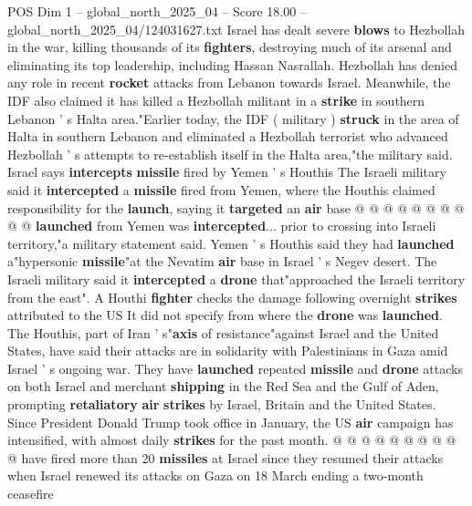 \begin{textsample}{POS Dim 1 – global\_north\_2025\_04 – Score 18.00 – global\_north\_2025\_04/124031627.txt}
Israel has dealt severe \textbf{blows} to Hezbollah in the war, killing thousands of its \textbf{fighters}, destroying much of its arsenal and eliminating its top leadership, including Hassan Nasrallah.
Hezbollah has denied any role in recent \textbf{rocket} attacks from Lebanon towards Israel.
Meanwhile, the IDF also claimed it has killed a Hezbollah militant in a \textbf{strike} in southern Lebanon ' s Halta area."Earlier today, the IDF ( military ) \textbf{struck} in the area of Halta in southern Lebanon and eliminated a Hezbollah terrorist who advanced Hezbollah ' s attempts to re-establish itself in the Halta area,"the military said.
Israel says \textbf{intercepts} \textbf{missile} fired by Yemen ' s Houthis The Israeli military said it \textbf{intercepted} a \textbf{missile} fired from Yemen, where the Houthis claimed responsibility for the \textbf{launch}, saying it \textbf{targeted} an \textbf{air} base @ @ @ @ @ @ @ @ @ @ \textbf{launched} from Yemen was \textbf{intercepted}... prior to crossing into Israeli territory,"a military statement said.
Yemen ' s Houthis said they had \textbf{launched} a"hypersonic \textbf{missile}"at the Nevatim \textbf{air} base in Israel ' s Negev desert.
The Israeli military said it \textbf{intercepted} a \textbf{drone} that"approached the Israeli territory from the east".
A Houthi \textbf{fighter} checks the damage following overnight \textbf{strikes} attributed to the US It did not specify from where the \textbf{drone} was \textbf{launched}.
The Houthis, part of Iran ' s"\textbf{axis} of resistance"against Israel and the United States, have said their attacks are in solidarity with Palestinians in Gaza amid Israel ' s ongoing war.
They have \textbf{launched} repeated \textbf{missile} and \textbf{drone} attacks on both Israel and merchant \textbf{shipping} in the Red Sea and the Gulf of Aden, prompting \textbf{retaliatory} \textbf{air} \textbf{strikes} by Israel, Britain and the United States.
Since President Donald Trump took office in January, the US \textbf{air} campaign has intensified, with almost daily \textbf{strikes} for the past month. @ @ @ @ @ @ @ @ @ @ have fired more than 20 \textbf{missiles} at Israel since they resumed their attacks when Israel renewed its attacks on Gaza on 18 March ending a two-month ceasefire

\end{textsample}
